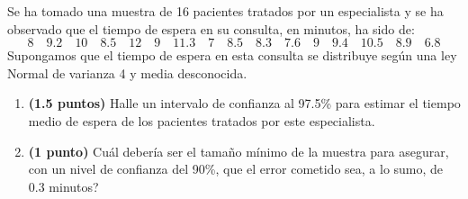 
Se ha tomado una muestra de 16 pacientes tratados por un especialista y se
ha observado que el tiempo de espera en su consulta, en minutos, ha sido de:
\[
8\quad 9.2\quad 10\quad 8.5\quad 12\quad 9\quad 11.3\quad 7\quad
8.5\quad 8.3\quad 7.6\quad 9\quad 9.4\quad 10.5\quad 8.9\quad 6.8
\]
Supongamos que el tiempo de espera en esta consulta se distribuye según una
ley Normal de varianza 4 y media desconocida.
\begin{enumerate}[label=\alph*)]
  \item \textbf{(1.5 puntos)} Halle un intervalo de confianza al 97.5\% para
  estimar el tiempo medio de espera de los pacientes tratados por este especialista.
  \item \textbf{(1 punto)} \textquestiondown{}Cuál debería ser el tamaño mínimo
  de la muestra para asegurar, con un nivel de confianza del 90\%, que el error
  cometido sea, a lo sumo, de 0.3 minutos?
\end{enumerate}
